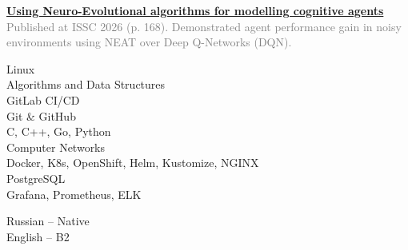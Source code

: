 \documentclass[10pt, a4paper]{article}
\begin{document}
\begin{minipage}[t]{0.4\textwidth}
\vspace{0.5cm}


\begin{minipage}[t]{\textwidth}
  \raggedright
  \Large \href{https://www.nsu.ru/upload/iblock/826/371ay2z05ae8pdhbgjr5b14hcokg31t1/%D0%98%D0%A2_%D0%9D%D0%B0%D1%83%D1%87%D0%BD%D1%8B%D0%B9%20%D0%B8%D0%BD%D0%B6%D0%B8%D0%BD%D0%B8%D1%80%D0%B8%D0%BD%D0%B3.pdf}{\textbf{Using Neuro-Evolutional algorithms for modelling cognitive agents}}\extlink  \\[4pt]
  \large \textcolor{graytext}{Published at ISSC 2026 (p. 168). Demonstrated agent performance gain in noisy environments using NEAT over Deep Q-Networks (DQN).} \\
\end{minipage}

\vspace{0.5cm}

\begin{minipage}[t]{1\textwidth}
    \raggedright
    \small
    Linux \\[4pt]
    Algorithms and Data Structures \\[4pt]
    GitLab CI/CD \\[4pt]
    Git \& GitHub \\[4pt]
    C, C++, Go, Python \\[4pt]
    Computer Networks \\[4pt]
    Docker, K8s, OpenShift, Helm, Kustomize, NGINX \\[4pt]
    PostgreSQL \\[4pt]
    Grafana, Prometheus, ELK
\end{minipage}

\vspace{0.5cm}

Russian -- Native \\[4pt]
English -- B2


\end{minipage}
\end{document}
